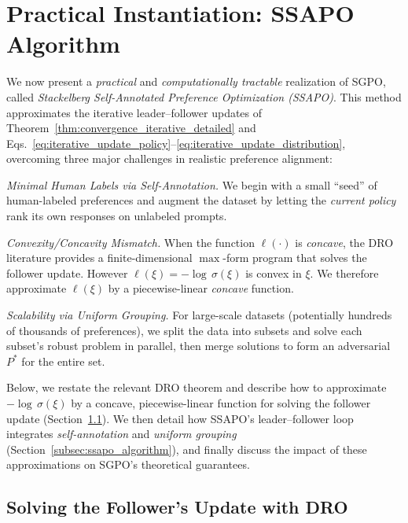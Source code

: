 \section{Practical Instantiation: SSAPO Algorithm}
\label{sec:ssapo}
We now present a \emph{practical} and \emph{computationally tractable} realization of SGPO, 
called \emph{Stackelberg Self-Annotated Preference Optimization (SSAPO)}. 
This method approximates the iterative leader--follower updates 
of Theorem~\ref{thm:convergence_iterative_detailed} 
and Eqs.~\eqref{eq:iterative_update_policy}--\eqref{eq:iterative_update_distribution}, 
overcoming three major challenges in realistic preference alignment:

\begin{compactenum}
    \item \emph{Minimal Human Labels via Self-Annotation.}  We begin with a small “seed” of human-labeled preferences and augment the dataset 
    by letting the \emph{current policy} rank its own responses on unlabeled prompts.
    \item \emph{Convexity/Concavity Mismatch.} When the function $\ell(\cdot)$ is \emph{concave}, the DRO literature \citet{Esfahani2018Data} provides a finite-dimensional $\max$-form program that solves the follower update. However $\ell(\xi) = -\!\log\,\sigma(\xi)$ is convex in $\xi$. We therefore approximate $\ell(\xi)$ by a piecewise-linear \emph{concave} function. 
    \item \emph{Scalability via Uniform Grouping.} 
    For large-scale datasets (potentially hundreds of thousands of preferences), we split the data into subsets and solve each subset’s robust problem in parallel, then merge solutions to form an adversarial $P^*$ for the entire set.
\end{compactenum}

Below, we restate the relevant DRO theorem and describe how to approximate 
$-\!\log\,\sigma(\xi)$ by a concave, piecewise-linear function 
for solving the follower update (Section~\ref{subsec:follower_update}). 
We then detail how SSAPO’s leader--follower loop integrates \emph{self-annotation} and \emph{uniform grouping} (Section~\ref{subsec:ssapo_algorithm}), and finally discuss the impact of these approximations on SGPO’s theoretical guarantees.

\subsection{Solving the Follower's Update with DRO}
\label{subsec:follower_update}
